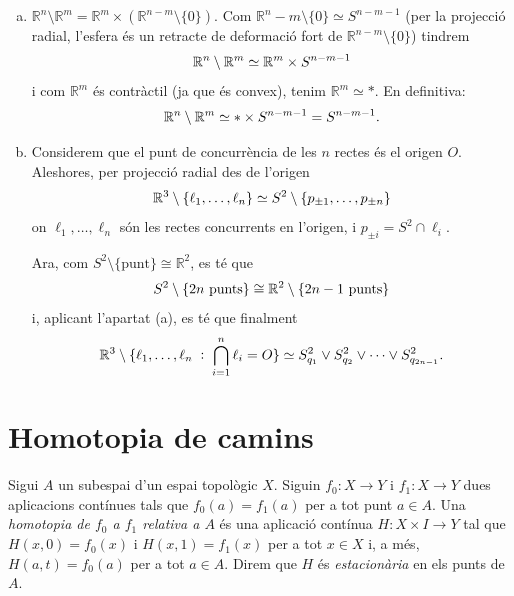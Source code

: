 \documentclass[../main.tex]{subfiles}
\begin{document}
\begin{sol}
\begin{enumerate}[(a)]
    \item $\mathbb{R}^n\setminus\mathbb{R}^m=\mathbb{R}^m\times(\mathbb{R}^{n-m}\setminus \{0\})$. Com $\mathbb{R}^n-m\setminus\{0\}\simeq S^{n-m-1}$ (per la projecció radial, l'esfera és un retracte de deformació fort de $\mathbb{R}^{n-m}\setminus\{0\}$) tindrem
    \begin{equation}
        \notag
        \mathbb{R}^n\setminus\mathbb{R}^m\simeq \mathbb{R}^m\times S^{n-m-1}
    \end{equation}
    i com $\mathbb{R}^m$ és contràctil (ja que és convex), tenim $\mathbb{R}^m\simeq *$. En definitiva:
    \begin{equation}
        \notag
        \mathbb{R}^n\setminus \mathbb{R}^m\simeq *\times S^{n-m-1}=S^{n-m-1}.
    \end{equation}
    
    \item Considerem que el punt de concurrència de les $n$ rectes és el origen $O$. Aleshores, per projecció radial des de l'origen
    \begin{equation}
        \notag
        \mathbb{R}^3\setminus\{\ell_1,\ldots,\ell_n\}\simeq S^2\setminus\{p_{\pm1},\ldots,p_{\pm n}\}
    \end{equation}
    on $\ell_1,\ldots,\ell_n$ són les rectes concurrents en l'origen, i $p_{\pm i} = S^2\cap \ell_i$.
    
    Ara, com $S^2\setminus\{\text{punt}\}\cong \mathbb{R}^2$, es té que 
    \begin{equation}
        \notag
        S^2\setminus\{2n\text{ punts}\}\cong \mathbb{R}^2\setminus\{2n-1\text{ punts}\}
    \end{equation}
    i, aplicant l'apartat (a), es té que finalment 
    \begin{equation}
        \notag
        \mathbb{R}^3\setminus\{\ell_1,\ldots,\ell_n\;:\;\bigcap_{i=1}^n \ell_i = O\}\simeq S_{q_1}^2\vee S_{q_2}^2\vee\cdots\vee S_{q_{2n-1}}^2.
    \end{equation}
\end{enumerate}
\end{sol}







\section{Homotopia de camins}

\begin{defi}
\label{def:homotopiarelativa} Sigui $A$ un subespai d'un espai topològic $X$. Siguin $f_0:X\rightarrow Y$ i $f_1:X\rightarrow Y$ dues aplicacions contínues tals que $f_0(a)=f_1(a)$ per a tot punt $a\in A$. Una \textit{homotopia de $f_0$ a $f_1$ relativa a $A$} és una aplicació contínua $H:X\times I\rightarrow Y$ tal que $H(x,0) = f_0(x)$ i $H(x,1) = f_1(x)$ per a tot $x\in X$ i, a més, $H(a,t) = f_0(a)$ per a tot $a\in A$. Direm que $H$ és \textit{estacionària} en els punts de $A$.
\end{defi}
\end{document}

